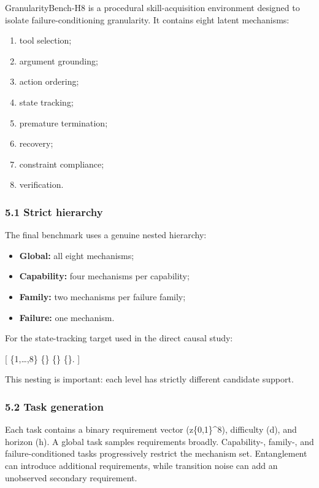 \documentclass[
]{article}
\providecommand{\tightlist}{%
  \setlength{\itemsep}{0pt}\setlength{\parskip}{0pt}}
\begin{document}
GranularityBench-H8 is a procedural skill-acquisition environment
designed to isolate failure-conditioning granularity. It contains eight
latent mechanisms:

\begin{enumerate}
\def\labelenumi{\arabic{enumi}.}
\tightlist
\item
  tool selection;
\item
  argument grounding;
\item
  action ordering;
\item
  state tracking;
\item
  premature termination;
\item
  recovery;
\item
  constraint compliance;
\item
  verification.
\end{enumerate}

\subsubsection{5.1 Strict hierarchy}\label{strict-hierarchy}

The final benchmark uses a genuine nested hierarchy:

\begin{itemize}
\tightlist
\item
  \textbf{Global:} all eight mechanisms;
\item
  \textbf{Capability:} four mechanisms per capability;
\item
  \textbf{Family:} two mechanisms per failure family;
\item
  \textbf{Failure:} one mechanism.
\end{itemize}

For the state-tracking target used in the direct causal study:

{[} \{1,\ldots,8\} \supset \{\} \supset
\{\} \supset \{\}. {]}

This nesting is important: each level has strictly different candidate
support.

\subsubsection{5.2 Task generation}\label{task-generation}

Each task contains a binary requirement vector (z\in\{0,1\}\^{}8),
difficulty (d), and horizon (h). A global task samples requirements
broadly. Capability-, family-, and failure-conditioned tasks
progressively restrict the mechanism set. Entanglement can introduce
additional requirements, while transition noise can add an unobserved
secondary requirement.
\end{document}
